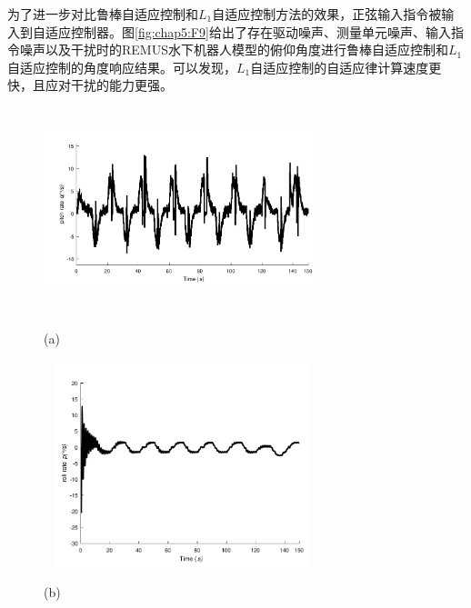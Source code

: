 为了进一步对比鲁棒自适应控制和$L_1$自适应控制方法的效果，正弦输入指令被输入到自适应控制器。图\ref{fig:chap5:F9}给出了存在驱动噪声、测量单元噪声、输入指令噪声以及干扰时的REMUS水下机器人模型的俯仰角度进行鲁棒自适应控制和$L_1$自适应控制的角度响应结果。可以发现，$L_1$自适应控制的自适应律计算速度更快，且应对干扰的能力更强。
\begin{figure}[htp]
\centering
\begin{minipage}{0.48\linewidth}
  \centerline{\includegraphics[width=8.0cm,height = 6cm]{figure/chap5/6dof/RMRAC/pitch_rate_q.pdf}}
  \centerline{(a) }
\end{minipage}
\hfill
\begin{minipage}{0.48\linewidth}
  \centerline{\includegraphics[width=8.0cm,height = 6cm]{figure/chap5/6dof/RMRAC/roll_rate_p.pdf}}
  \centerline{(b) }
\end{minipage}
\label{fig:chap5:F6}
\end{figure}

